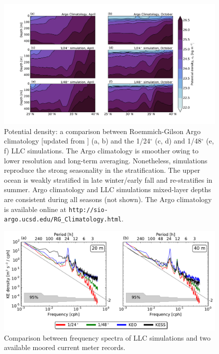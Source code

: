 \documentclass[draft,grl]{agutexSI}
\begin{document}
 \begin{figure}
    \begin{center}
      \includegraphics[width=40pc]{figs/figS4.pdf}
   \caption{Potential density: a comparison between Roemmich-Gilson Argo
           climatology [updated from \cite{roemmich_gilson2009}] (a, b) and the 1/24$^\circ$ (c, d)
           and  1/48$^\circ$ (e, f) LLC simulations. The Argo climatology is smoother
           owing to lower resolution and long-term averaging. Nonetheless, simulations reproduce the strong
           seasonality in the stratification. The upper ocean is weakly stratified in late winter/early fall
           and re-stratifies in summer. Argo climatology and LLC simulations mixed-layer depths are consistent
            during all seasons (not shown). The Argo climatology is available online at
           \texttt{http://sio-argo.ucsd.edu/RG\_Climatology.html}.}
   \label{figS2_1}
   \end{center}
 \end{figure}

 \begin{figure}
    \begin{center}
      \includegraphics[width=40pc]{figs/figS5.pdf}
   \caption{Comparison between frequency spectra of LLC simulations and two
   available moored current meter records.}
   \label{figA1}
   \end{center}
 \end{figure}
\end{document}
